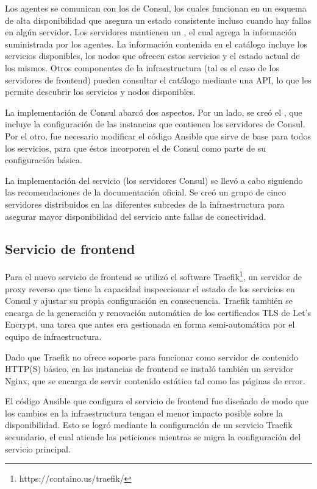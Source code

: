 Los agentes se comunican con los  de Consul, los
cuales funcionan en un esquema de alta disponibilidad que asegura un
estado consistente incluso cuando hay fallas en algún servidor. Los
servidores mantienen un , el cual agrega la
información suministrada por los agentes. La información contenida en
el catálogo incluye los servicios disponibles, los nodos que ofrecen
estos servicios y el estado actual de los mismos. Otros componentes de
la infraestructura (tal es el caso de los servidores de frontend)
pueden consultar el catálogo mediante una API, lo que les permite
descubrir los servicios y nodos disponibles.

La implementación de Consul abarcó dos aspectos. Por un lado, se creó
el , que incluye la configuración de las
instancias que contienen los servidores de Consul. Por el otro, fue
necesario modificar el código Ansible que sirve de base para todos los
servicios, para que éstos incorporen el  de Consul como
parte de su configuración básica.

La implementación del servicio (los servidores Consul) se llevó a cabo
siguiendo las recomendaciones de la documentación oficial. Se creó un
grupo de cinco servidores distribuidos en las diferentes subredes de
la infraestructura para asegurar mayor disponibilidad del servicio
ante fallas de conectividad.

\subsection{Servicio de frontend}

Para el nuevo servicio de frontend se utilizó el software
Traefik\footnote{ https://containo.us/traefik/}, un servidor de proxy
reverso que tiene la capacidad inspeccionar el estado de los servicios
en Consul y ajustar su propia configuración en consecuencia. Traefik
también se encarga de la generación y renovación automática de los
certificados TLS de Let’s Encrypt, una tarea que antes era gestionada
en forma semi-automática por el equipo de infraestructura.

Dado que Traefik no ofrece soporte para funcionar como servidor de
contenido HTTP(S) básico, en las instancias de frontend se instaló
también un servidor Nginx, que se encarga de servir contenido estático
tal como las páginas de error.

El código Ansible que configura el servicio de frontend fue diseñado
de modo que los cambios en la infraestructura tengan el menor impacto
posible sobre la disponibilidad. Esto se logró mediante la
configuración de un servicio Traefik secundario, el cual atiende las
peticiones mientras se migra la configuración del servicio principal.


